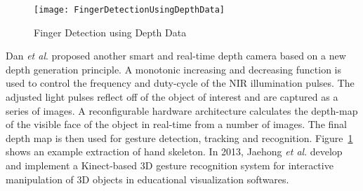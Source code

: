 %
\begin{figure}[b]
\centering
\texttt{[image: FingerDetectionUsingDepthData]}
\caption{Finger Detection using Depth Data \cite{NIRGesture14}}
\label{FingerDetectionUsingDepthData}
\end{figure}%
Dan \textit{et al}. \cite{NIRGesture14} proposed another smart and real-time depth camera based on a new depth generation principle. A monotonic increasing and decreasing function is used to control the frequency and duty-cycle of the \gls{NIR} illumination pulses. The adjusted light pulses reflect off of the object of interest and are captured as a series of images. A reconfigurable hardware architecture calculates the depth-map of the visible face of the object in real-time from a number of images. The final depth map is then used for gesture detection, tracking and recognition. Figure~\ref{FingerDetectionUsingDepthData} shows an example extraction of hand skeleton. In 2013, Jaehong \textit{et al}. \cite{InteractiveManipulation_2013} develop and implement a Kinect-based \gls{3D} gesture recognition system for interactive
manipulation of \gls{3D} objects in educational visualization softwares. 
\\\indent%
%
